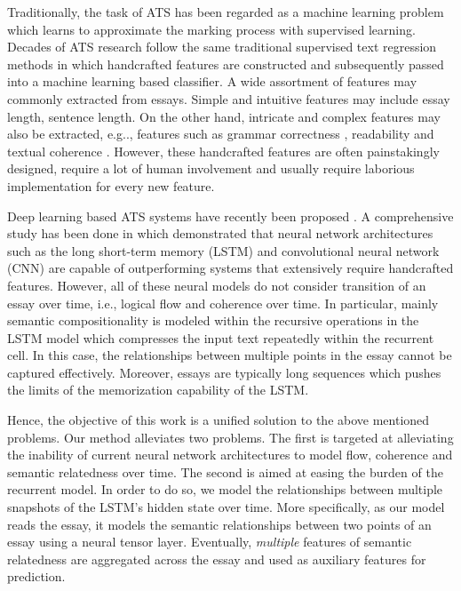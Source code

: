 \documentclass[letterpaper]{article}
\begin{document}
Traditionally, the task of ATS has been regarded as a machine learning problem \cite{larkey1998automatic,attali2004automated} which learns to approximate the marking process with supervised learning. Decades of ATS research follow the same traditional supervised text regression methods in which handcrafted features are constructed and subsequently passed into a machine learning based classifier. A wide assortment of features may commonly extracted from essays. Simple and intuitive features may include essay length, sentence length. On the other hand, intricate and complex features may also be extracted, e.g.., features such as grammar correctness \cite{attali2004automated}, readability \cite{DBLP:conf/bea/ZeschWS15} and textual coherence \cite{DBLP:conf/emnlp/ChenH13}. However, these handcrafted features are often painstakingly designed, require a lot of human involvement and usually require laborious implementation for every new feature. 


Deep learning based ATS systems have recently been proposed \cite{DBLP:conf/emnlp/DongZ16,DBLP:conf/emnlp/TaghipourN16,DBLP:conf/acl/AlikaniotisYR16}. A comprehensive study has been done in \cite{DBLP:conf/emnlp/TaghipourN16} which demonstrated that neural network architectures such as the long short-term memory (LSTM) \cite{hochreiter1997long} and convolutional neural network (CNN) are capable of outperforming systems that extensively require handcrafted features. However, all of these neural models do not consider transition of an essay over time, i.e., logical flow and coherence over time. In particular, mainly semantic compositionality is modeled within the recursive operations in the LSTM model which compresses the input text repeatedly within the recurrent cell. In this case, the relationships between multiple points in the essay cannot be captured effectively. Moreover, essays are typically long sequences which pushes the limits of the memorization capability of the LSTM. 


Hence, the objective of this work is a unified solution to the above mentioned problems. Our method alleviates two problems. The first is targeted at alleviating the inability of current neural network architectures to model flow, coherence and semantic relatedness over time. The second is aimed at easing the burden of the recurrent model. In order to do so, we model the relationships between multiple snapshots of the LSTM's hidden state over time. More specifically, as our model reads the essay, it models the semantic relationships between two points of an essay using a neural tensor layer. Eventually, \textit{multiple} features of semantic relatedness are aggregated across the essay and used as auxiliary features for prediction. 
\end{document}
